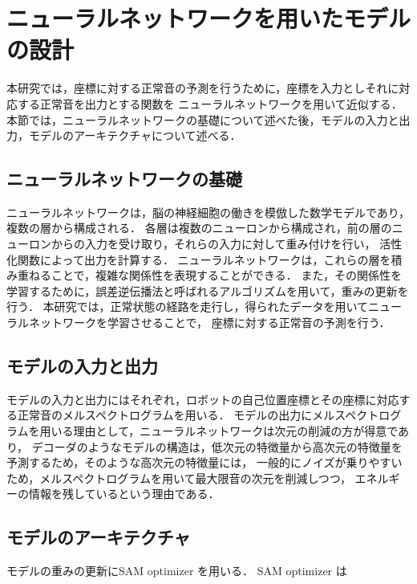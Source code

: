 \documentclass[../main]{subfiles}
\begin{document}
\section{ニューラルネットワークを用いたモデルの設計}
本研究では，座標に対する正常音の予測を行うために，座標を入力としそれに対応する正常音を出力とする関数を
ニューラルネットワークを用いて近似する．
本節では，ニューラルネットワークの基礎について述べた後，モデルの入力と出力，モデルのアーキテクチャについて述べる．
\subsection{ニューラルネットワークの基礎}
ニューラルネットワークは，脳の神経細胞の働きを模倣した数学モデルであり，複数の層から構成される．
各層は複数のニューロンから構成され，前の層のニューロンからの入力を受け取り，それらの入力に対して重み付けを行い，
活性化関数によって出力を計算する．
ニューラルネットワークは，これらの層を積み重ねることで，複雑な関係性を表現することができる．
また，その関係性を学習するために，誤差逆伝播法と呼ばれるアルゴリズムを用いて，重みの更新を行う．
本研究では，正常状態の経路を走行し，得られたデータを用いてニューラルネットワークを学習させることで，
座標に対する正常音の予測を行う．
\subsection{モデルの入力と出力}
モデルの入力と出力にはそれぞれ，ロボットの自己位置座標とその座標に対応する正常音のメルスペクトログラムを用いる．
モデルの出力にメルスペクトログラムを用いる理由として，ニューラルネットワークは次元の削減の方が得意であり，
デコーダのようなモデルの構造は，低次元の特徴量から高次元の特徴量を予測するため，そのような高次元の特徴量には，
一般的にノイズが乗りやすいため，メルスペクトログラムを用いて最大限音の次元を削減しつつ，
エネルギーの情報を残しているという理由である．
\subsection{モデルのアーキテクチャ}
モデルの重みの更新にSAM optimizer を用いる．
SAM optimizer は
\label{sec:pmethod_preprocessing}
\end{document}
